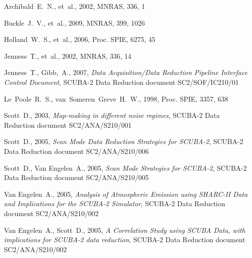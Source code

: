 \documentclass[oneside,11pt]{starlink}
\begin{document}
\begin{thebibliography}{}

Archibald~E.~N., et~al., 2002, MNRAS, 336, 1

Buckle~J.~V., et~al., 2009, MNRAS, 399, 1026




Holland~W.~S., et~al., 2006, Proc. SPIE, 6275, 45

Jenness~T., et~al., 2002, MNRAS, 336, 14

Jenness~T., Gibb,~A., 2007, \textit{Data Acquisition/Data Reduction
  Pipeline Interface Control Document}, SCUBA-2 Data Reduction
document SC2/SOF/IC210/01

Le~Poole~R.~S., van~Someren~Greve~H.~W., 1998, Proc. SPIE, 3357, 638

Scott~D., 2003, {\it Map-making in different noise regimes}, SCUBA-2
  Data Reduction document SC2/ANA/S210/001

Scott~D., 2005, {\it Scan Mode Data Reduction Strategies for
  SCUBA-2}, SCUBA-2 Data Reduction document SC2/ANA/S210/006

Scott~D., Van Engelen~A., 2005, {\it Scan Mode Strategies for
  SCUBA-2}, SCUBA-2 Data Reduction document SC2/ANA/S210/005

Van Engelen~A., 2005, {\it Analysis of Atmospheric Emission using
  SHARC-II Data and Implications for the SCUBA-2 Simulator},
  SCUBA-2 Data Reduction document SC2/ANA/S210/002

Van Engelen~A., Scott~D., 2005, {\it A Correlation Study using SCUBA
  Data, with implications for SCUBA-2 data reduction},
  SCUBA-2 Data Reduction document SC2/ANA/S210/002



\end{thebibliography}
\end{document}
